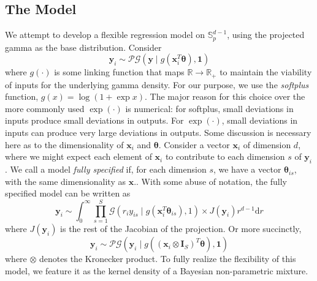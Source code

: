 \subsection{The Model}
We attempt to develop a flexible regression model on $\mathbb{S}_p^{d-1}$, using the projected gamma as
    the base distribution.  Consider
    \[
        \bm{y}_i \sim \mathcal{PG}(\bm{y}\mid g(\bm{x}_i^T\bm{\theta}), \bm{1})    
    \]
    where $g(\cdot)$ is some linking function that maps $\mathbb{R}\to\mathbb{R}_+$ to maintain the
    viability of inputs for the underlying gamma density.  For our purpose, we use the \emph{softplus}
    function, $g(x) = \log(1 + \exp x)$. The major reason for this choice over the more commonly used
    $\exp(\cdot)$ is numerical: for softplus, small deviations in inputs produce small deviations in
    outputs.  For $\exp(\cdot)$, small deviations in inputs can produce very large deviations in
    outputs.  Some discussion 
    is necessary here as to the dimensionality of $\bm{x}_i$ and $\bm{\theta}$.  Consider a vector 
    $\bm{x}_i$ of dimension $d$, where we might expect each element of $\bm{x}_i$ to contribute to each
    dimension $s$ of $\bm{y}_i$.  We call a model \emph{fully specified} if, for each dimension $s$, we
    have a vector $\bm{\theta}_{is}$, with the same dimensionality as $\bm{x}$.. With some abuse of 
    notation, the fully specified model can be written as
    \[
        \bm{y}_i \sim \int_0^{\infty}
            \prod_{s = 1}^S \mathcal{G}\left(r_iy_{is}\mid g(\bm{x}_i^T\bm{\theta}_{is}), 1\right) \times J(\bm{y}_i) r^{d-1}\text{d}r
    \]
    where $J(\bm{y}_i)$ is the rest of the Jacobian of the projection.  Or more succinctly, 
    \[
        \bm{y}_i \sim \mathcal{PG}\left(\bm{y}_i \mid g((\bm{x}_i \otimes \bm{I}_{S})^T\bm{\theta}), \bm{1}\right)
    \]
    where $\otimes$ denotes the Kronecker product.  To fully realize the flexibility of this model,
    we feature it as the kernel density of a Bayesian non-parametric mixture.

